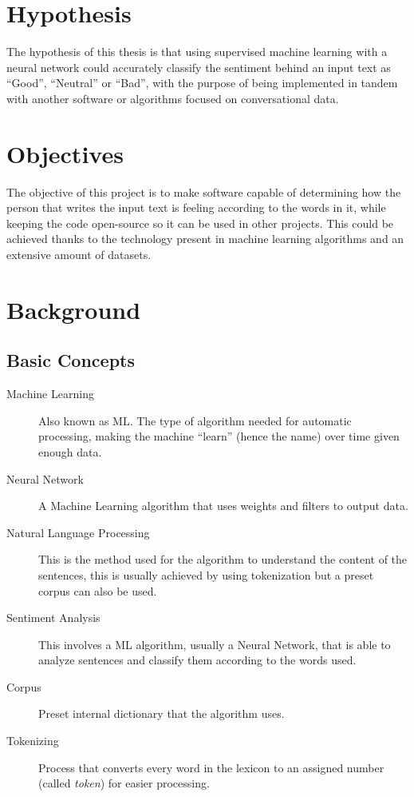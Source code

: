 \documentclass[a4]{sciposter}
\begin{document}
\begin{multicols}{3}
\section{Hypothesis}
The hypothesis of this thesis is that using supervised machine learning with a neural network could accurately classify the sentiment behind an input text as ``Good'', ``Neutral'' or ``Bad'', with the purpose of being implemented in tandem with another software or algorithms focused on conversational data.

\section{Objectives}
The objective of this project is to make software capable of determining how the person that writes the input text is feeling according to the words in it, while keeping the code open-source so it can be used in other projects. This could be achieved thanks to the technology present in machine learning algorithms and an extensive amount of datasets.

\section{Background}
\subsection{Basic Concepts}
\begin{description}
	\item[Machine Learning]{Also known as ML. The type of algorithm needed for automatic processing, making the machine ``learn'' (hence the name) over time given enough data.}
	\item[Neural Network]{A Machine Learning algorithm that uses weights and filters to output data.}
	\item[Natural Language Processing]{This is the method used for the algorithm to understand the content of the sentences, this is usually achieved by using tokenization but a preset corpus can also be used.}	
	\item[Sentiment Analysis]{This involves a ML algorithm, usually a Neural Network, that is able to analyze sentences and classify them according to the words used.}
	\item[Corpus]{Preset internal dictionary that the algorithm uses.}
	\item[Tokenizing]{Process that converts every word in the lexicon to an assigned number (called \textit{token}) for easier processing.}
\end{description}

\end{multicols}
\end{document}

